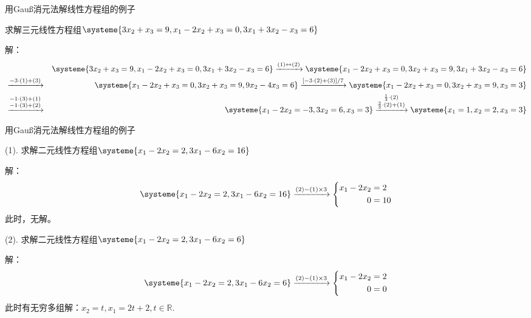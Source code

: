 
\begin{frame}{用Gau{\ss}消元法解线性方程组的例子}

求解三元线性方程组$\systeme{3x_2 + x_3 = 9, x_1 - 2x_2 + x_3 = 0 , 3x_1 + 3x_2 - x_3 = 6}$

\pause

解：
{\scriptsize
\begin{eqnarray*}
& & \systeme{3x_2 + x_3 = 9 , x_1 - 2x_2 + x_3 = 0 , 3x_1 + 3x_2 - x_3 = 6} \xrightarrow{(1)\leftrightarrow(2)} \systeme{x_1 - 2x_2 + x_3 = 0 , 3x_2 + x_3 = 9 , 3x_1 + 3x_2 - x_3 = 6} \\
& \xrightarrow{-3\cdot(1) + (3)} & \systeme{x_1 - 2x_2 + x_3 = 0, 3x_2 + x_3 = 9,  9x_2 - 4x_3 = 6} \xrightarrow{[-3\cdot(2)+(3)]/7} \systeme{x_1 - 2x_2 + x_3 = 0 , 3x_2 + x_3 = 9 , x_3 = 3} \\ & \xrightarrow{\substack{-1\cdot(3)+(1) \\ -1\cdot(3)+(2)}} & \systeme{x_1 - 2x_2 = -3 , 3x_2 = 6, x_3 = 3} \xrightarrow{\substack{\frac13\cdot(2) \\ \frac23\cdot(2)+(1)}} \systeme{x_1 = 1, x_2 = 2, x_3 = 3}
\end{eqnarray*}
}

\end{frame}


\begin{frame}{用Gau{\ss}消元法解线性方程组的例子}

(1). 求解二元线性方程组$\systeme{x_1 - 2x_2 = 2, 3x_1 - 6x_2 = 16}$

\pause

解：
\[\systeme{x_1 - 2x_2 = 2, 3x_1 - 6x_2 = 16} \xrightarrow{(2)-(1)\times 3} \left\{\begin{aligned}
x_1 - 2x_2 & = 2 \\ 0 & = 10
\end{aligned}\right.\]
此时，无解。

\pause

(2). 求解二元线性方程组$\systeme{x_1 - 2x_2 = 2, 3x_1 - 6x_2 = 6}$

\pause

解：
\[\systeme{x_1 - 2x_2 = 2, 3x_1 - 6x_2 = 6} \xrightarrow{(2)-(1)\times 3} \left\{\begin{aligned}
x_1 - 2x_2 & = 2 \\ 0 & = 0
\end{aligned}\right.\]
此时有无穷多组解：$x_2 = t, x_1 = 2t+2, t\in\mathbb{R}.$

\end{frame}

